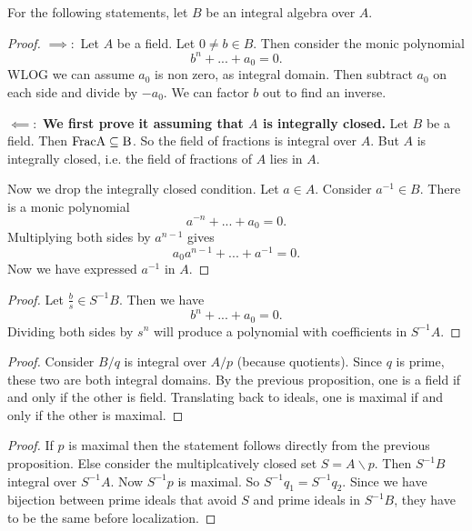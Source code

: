 \section{}

For the following statements, let $B$ be an integral algebra over $A$. 
\begin{proof}
    $\implies: $ Let $A$ be a field. Let $0\neq b\in B$. Then consider the monic polynomial \[
    b^n + ... +a_0 =0.
    \]
    WLOG we can assume $a_0$ is non zero, as integral domain. Then subtract $a_0$ on each side and divide by $-a_0$. We can factor $b$ out to find an inverse.
    
    $\impliedby:$ 
    \textbf{We first prove it assuming that $A$ is integrally closed.}
    Let $B$ be a field. Then $\rm{Frac} A\subseteq B$. So the field of fractions is integral over $A$. But $A$ is integrally closed, i.e. the field of fractions of $A$ lies in $A$. 


    Now we drop the integrally closed condition. Let $a\in A$. Consider $a^{-1}\in B$. There is a monic polynomial \[
    a^{-n}+ ... + a_0 =0.
    \]
    Multiplying both sides by $a^{n-1}$ gives \[
    a_0 a^{n-1} + ... + a^{-1}=0.
    \]
    Now we have expressed $a^{-1}$ in $A$.
\end{proof}
\begin{proof}
    Let $\frac{b}{s}\in S^{-1}B$.
    Then we have \[
    b^n + ... +a_0=0.
    \]
    Dividing both sides by $s^n$ will produce a polynomial with coefficients in $S^{-1}A$.
\end{proof}
\begin{proof}
    Consider $B/q$ is integral over $A/p$ (because quotients). Since $q$ is prime, these two are both integral domains. By the previous proposition, one is a field if and only if the other is field. Translating back to ideals, one is maximal if and only if the other is maximal.
\end{proof}

\begin{proof}
    If $p$ is maximal then the statement follows directly from the previous proposition. Else consider the multiplcatively closed set $S=A \backslash p$. Then $S^{-1}B$ integral over $S^{-1} A$. Now $S^{-1}p$ is maximal. So $S^{-1}q_1=S^{-1}q_2$. Since we have bijection between prime ideals that avoid $S$ and prime ideals in $S^{-1}B$, they have to be the same before localization.
\end{proof}


